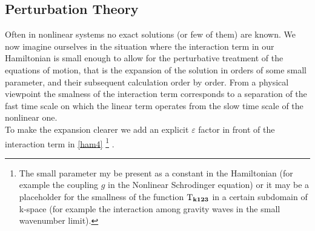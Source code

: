 \subsection{Perturbation Theory}

Often in nonlinear systems no exact solutions (or few of them) are known. We now imagine ourselves in the situation where the interaction term in our Hamiltonian 
is small enough to allow for the perturbative treatment of the equations of motion, that is the expansion of the solution in orders of some small parameter, 
and their subsequent calculation order by order. From a physical viewpoint the smalness of the interaction term corresponds to a 
separation of the fast time scale on which the linear term operates from the slow time scale of the nonlinear one.\\
 To make the expansion clearer we add an explicit $\varepsilon$ factor in front of the interaction term in \eqref{ham4}
\footnote{The small parameter my be present as a constant in the Hamiltonian (for example the coupling $g$ in the Nonlinear Schrodinger equation) or 
it may be a placeholder for the smallness of the function $\mathrm{T}_{\mathbf{k123}}$ in a certain subdomain of k-space (for example the interaction among gravity waves in 
the small wavenumber limit). } . \\

